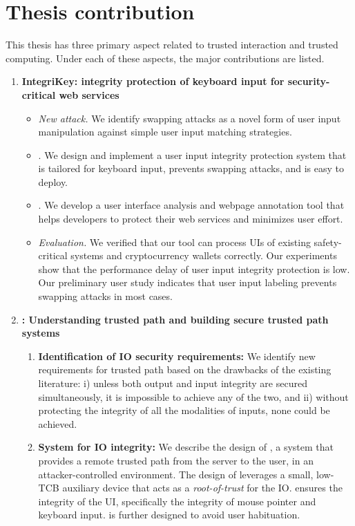 \section{Thesis contribution} This thesis has three primary aspect related to trusted interaction and trusted computing. Under each of these aspects, the major contributions are listed.

\begin{enumerate}
  \item \textbf{IntegriKey: integrity protection of keyboard input for security-critical web services}
\begin{itemize}
    \item \emph{New attack.} We identify swapping attacks as a novel form of user input manipulation against simple user input matching strategies.
    \item \name. We design and implement a user input integrity protection system that is tailored for keyboard input, prevents swapping attacks, and is easy to deploy.
    \item \tool. We develop a user interface analysis and webpage annotation tool that helps developers to protect their web services and minimizes user effort.
    \item \emph{Evaluation.} We verified that our tool can process UIs of existing safety-critical systems and cryptocurrency wallets correctly. Our experiments show that the performance delay of \name user input integrity protection is low. Our preliminary user study indicates that user input labeling prevents swapping attacks in most cases.
\end{itemize}



    \item \textbf{\protection: Understanding trusted path and building secure trusted path systems}
    \begin{enumerate}
        \item  \textbf{Identification of IO security requirements:} We identify new requirements for trusted path based on the drawbacks of the existing literature: i) unless both output and input integrity are secured simultaneously, it is impossible to achieve any of the two, and ii) without protecting the integrity of all the modalities of inputs, none could be achieved.
        
        \item \textbf{System for IO integrity:} We describe the design of \protection, a system that provides a remote trusted path from the server to the user, in an attacker-controlled environment. The design of \protection leverages a small, low-TCB auxiliary device that acts as a \emph{root-of-trust} for the IO. \protection ensures the integrity of the UI, specifically the integrity of mouse pointer and keyboard input. \protection is further designed to avoid user habituation.
        

\end{enumerate}
\end{enumerate}
